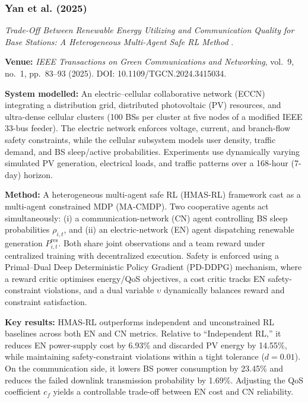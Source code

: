 \subsubsection{Yan et al. (2025)}
\label{sec:yan-et-al}
\textit{Trade-Off Between Renewable Energy Utilizing and Communication Quality for Base Stations: A Heterogeneous Multi-Agent Safe RL Method} \cite{yan_2025_safe_marl_bs}.

\textbf{Venue:} \textit{IEEE Transactions on Green Communications and Networking}, vol.~9, no.~1, pp.~83--93 (2025). DOI: 10.1109/TGCN.2024.3415034.

\textbf{System modelled:} An electric--cellular collaborative network (ECCN) integrating a distribution grid, distributed photovoltaic (PV) resources, and ultra-dense cellular clusters (100 BSs per cluster at five nodes of a modified IEEE 33-bus feeder). The electric network enforces voltage, current, and branch-flow safety constraints, while the cellular subsystem models user density, traffic demand, and BS sleep/active probabilities. Experiments use dynamically varying simulated PV generation, electrical loads, and traffic patterns over a 168-hour (7-day) horizon.

\textbf{Method:} A heterogeneous multi-agent safe RL (HMAS-RL) framework cast as a multi-agent constrained MDP (MA-CMDP). Two cooperative agents act simultaneously: (i) a communication-network (CN) agent controlling BS sleep probabilities $\rho_{i,t}$, and (ii) an electric-network (EN) agent dispatching renewable generation $P^{\mathrm{res}}_{i,t}$. Both share joint observations and a team reward under centralized training with decentralized execution. Safety is enforced using a Primal--Dual Deep Deterministic Policy Gradient (PD-DDPG) mechanism, where a reward critic optimises energy/QoS objectives, a cost critic tracks EN safety-constraint violations, and a dual variable $\upsilon$ dynamically balances reward and constraint satisfaction.

\textbf{Key results:} HMAS-RL outperforms independent and unconstrained RL baselines across both EN and CN metrics. Relative to ``Independent RL,'' it reduces EN power-supply cost by 6.93\% and discarded PV energy by 14.55\%, while maintaining safety-constraint violations within a tight tolerance ($d = 0.01$). On the communication side, it lowers BS power consumption by 23.45\% and reduces the failed downlink transmission probability by 1.69\%. Adjusting the QoS coefficient $c_f$ yields a controllable trade-off between EN cost and CN reliability.

